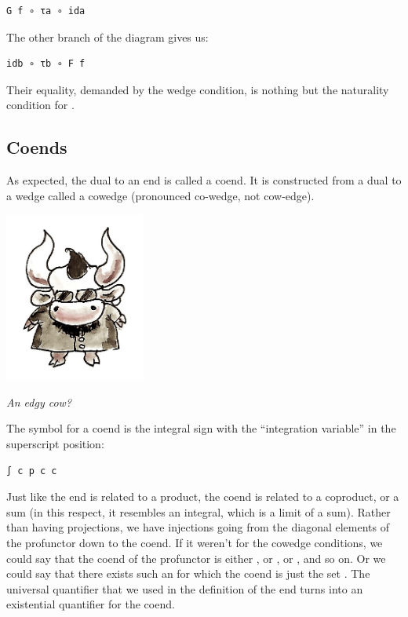 \begin{verbatim}
G f ∘ τa ∘ ida
\end{verbatim}

The other branch of the diagram gives us:

\begin{verbatim}
idb ∘ τb ∘ F f
\end{verbatim}

Their equality, demanded by the wedge condition, is nothing but the
naturality condition for .

\subsection{Coends}\label{coends}

As expected, the dual to an end is called a coend. It is constructed
from a dual to a wedge called a cowedge (pronounced co-wedge, not
cow-edge).

\hypertarget{attachment_8533}{}
\includegraphics[width=1.82292in]{images/end-31.jpg}

\emph{An edgy cow?}

The symbol for a coend is the integral sign with the ``integration
variable'' in the superscript position:

\begin{verbatim}
∫ c p c c
\end{verbatim}

Just like the end is related to a product, the coend is related to a
coproduct, or a sum (in this respect, it resembles an integral, which is
a limit of a sum). Rather than having projections, we have injections
going from the diagonal elements of the profunctor down to the coend. If
it weren't for the cowedge conditions, we could say that the coend of
the profunctor  is either , or
, or , and so on. Or we could say that
there exists such an  for which the coend is just the set
. The universal quantifier that we used in the
definition of the end turns into an existential quantifier for the
coend.


